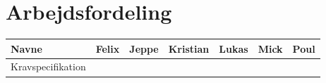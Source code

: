 \chapter*{Arbejdsfordeling}

\begin{tabular}{|l|c|c|c|c|c|c|}
\hline 
\textbf{Navne} 			& Felix 		& Jeppe 		& Kristian 	& Lukas 		& Mick 		& Poul  \\ 
\hline
Kravspecifikation 		&\checkmark 	&\checkmark	&\checkmark	&\checkmark	&\checkmark 	&\checkmark \\ 
\hline  
\hline 
\end{tabular} 